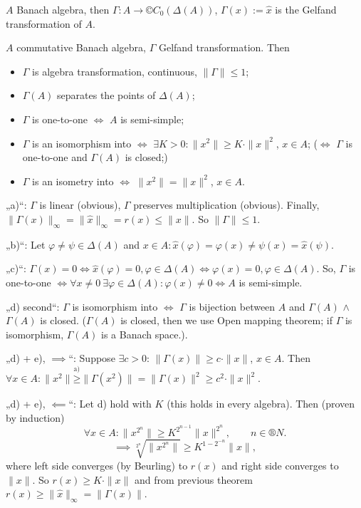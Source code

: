 \documentclass[12pt]{article}					%
\begin{document}
\begin{definice}
	$A$ Banach algebra, then $Γ: A \rightarrow ©C_0(Δ(A))$, $Γ(x) := \hat{x}$ is the Gelfand transformation of $A$.
\end{definice}

\begin{veta}
	$A$ commutative Banach algebra, $Γ$ Gelfand transformation. Then

	\begin{itemize}
		\item $Γ$ is algebra transformation, continuous, $\|Γ\| ≤ 1$;
		\item $Γ(A)$ separates the points of $Δ(A)$;
		\item $Γ$ is one-to-one $\Leftrightarrow$ $A$ is semi-simple;
		\item $Γ$ is an isomorphism into $\Leftrightarrow$ $\exists K > 0: \|x^2\| ≥ K·\|x\|^2$, $x \in A$; ($\Leftrightarrow$ $Γ$ is one-to-one and $Γ(A)$ is closed;)
		\item $Γ$ is an isometry into $\Leftrightarrow$ $\|x^2\| = \|x\|^2$, $x \in A$.
	\end{itemize}

	\begin{dukazin}
		„a)“: $Γ$ is linear (obvious), $Γ$ preserves multiplication (obvious). Finally, $\|Γ(x)\|_∞ = \|\hat{x}\|_∞ = r(x) ≤ \|x\|$. So $\|Γ\| ≤ 1$.

		„b)“: Let $φ ≠ ψ \in Δ(A)$ and $x \in A: \hat{x}(φ) = φ(x) ≠ ψ(x) = \hat{x}(ψ)$.

		„c)“: $Γ(x) = 0 \Leftrightarrow \hat{x}(φ) = 0, φ \in Δ(A) \Leftrightarrow φ(x) = 0, φ \in Δ(A)$. So, $Γ$ is one-to-one $\Leftrightarrow \forall x ≠ 0\ \exists φ \in Δ(A): φ(x) ≠ 0 \Leftrightarrow A$ is semi-simple.

		„d) second“: $Γ$ is isomorphism into $\Leftrightarrow$ $Γ$ is bijection between $A$ and $Γ(A)$ $\land$ $Γ(A)$ is closed. ($Γ(A)$ is closed, then we use Open mapping theorem; if $Γ$ is isomorphism, $Γ(A)$ is a Banach space.).

		„d) + e), $\implies$“: Suppose $\exists c > 0$: $\|Γ(x)\| ≥ c·\|x\|$, $x \in A$. Then $\forall x \in A: \|x^2\| \overset{\text{a)}}≥ \|Γ(x^2)\| = \|Γ(x)\|^2 ≥ c^2·\|x\|^2$.

		„d) + e), $\impliedby$“: Let d) hold with $K$ (this holds in every algebra). Then (proven by induction)
		$$ \forall x \in A: \|x^{2^n}\| ≥ K^{2^{n - 1}} \|x\|^{2^n}, \qquad n \in ®N. $$
		$$ \implies \sqrt[2^n]{\|x^{2^n}\|} ≥ K^{1 - 2^{-n}} \|x\|, $$
		where left side converges (by Beurling) to $r(x)$ and right side converges to $\|x\|$. So $r(x) ≥ K·\|x\|$ and from previous theorem $r(x) ≥ \|\hat{x}\|_∞ = \|Γ(x)\|$.
	\end{dukazin}
\end{veta}
\end{document}
